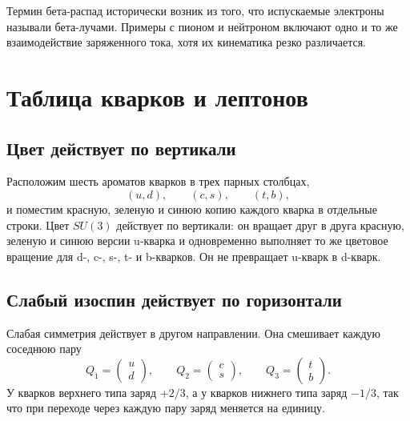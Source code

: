 Термин бета-распад исторически возник из того, что испускаемые электроны называли бета-лучами. Примеры с пионом и нейтроном включают одно и то же взаимодействие заряженного тока, хотя их кинематика резко различается.

\section{Таблица кварков и лептонов}

\subsection{Цвет действует по вертикали}

Расположим шесть ароматов кварков в трех парных столбцах,
\begin{equation}
(u,d),\qquad(c,s),\qquad(t,b),
\end{equation}
и поместим красную, зеленую и синюю копию каждого кварка в отдельные строки. Цвет \(SU(3)\) действует по вертикали: он вращает друг в друга красную, зеленую и синюю версии u-кварка и одновременно выполняет то же цветовое вращение для d-, c-, s-, t- и b-кварков. Он не превращает u-кварк в d-кварк.

\subsection{Слабый изоспин действует по горизонтали}

Слабая симметрия действует в другом направлении. Она смешивает каждую соседнюю пару
\begin{equation}
Q_1=\begin{pmatrix}u\\d\end{pmatrix},
\qquad
Q_2=\begin{pmatrix}c\\s\end{pmatrix},
\qquad
Q_3=\begin{pmatrix}t\\b\end{pmatrix}.
\label{eq:l5-quark-doublets}
\end{equation}
У кварков верхнего типа заряд \(+2/3\), а у кварков нижнего типа заряд \(-1/3\), так что при переходе через каждую пару заряд меняется на единицу.

